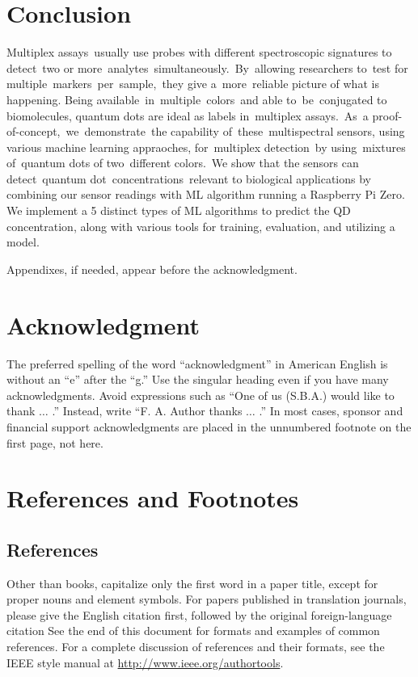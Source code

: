 \documentclass[journal,twoside,web]{ieeecolor}
\begin{document}
\section{Conclusion}
Multiplex assays usually use probes with different spectroscopic signatures to detect two or more analytes simultaneously. By allowing researchers to test for multiple markers per sample, they give a more reliable picture of what is happening. Being available in multiple colors and able to be conjugated to biomolecules, quantum dots are ideal as labels in multiplex assays. As a proof-of-concept, we demonstrate the capability of these multispectral sensors, using various machine learning appraoches, for multiplex detection by using mixtures of quantum dots of two different colors. We show that the sensors can detect quantum dot concentrations relevant to biological applications by combining our sensor readings with ML algorithm running a Raspberry Pi Zero. We implement a 5 distinct types of ML algorithms to predict the QD concentration, along with various tools for training, evaluation, and utilizing a model. 
\\

\appendices

Appendixes, if needed, appear before the acknowledgment.

\section*{Acknowledgment}

The preferred spelling of the word ``acknowledgment'' in American English is 
without an ``e'' after the ``g.'' Use the singular heading even if you have 
many acknowledgments. Avoid expressions such as ``One of us (S.B.A.) would 
like to thank $\ldots$ .'' Instead, write ``F. A. Author thanks $\ldots$ .'' In most 
cases, sponsor and financial support acknowledgments are placed in the 
unnumbered footnote on the first page, not here.

\section*{References and Footnotes}

\subsection{References}
Other than books, capitalize only the first word in a paper title, except 
for proper nouns and element symbols. For papers published in translation 
journals, please give the English citation first, followed by the original 
foreign-language citation See the end of this document for formats and 
examples of common references. For a complete discussion of references and 
their formats, see the IEEE style manual at
\underline{http://www.ieee.org/authortools}.
\end{document}
